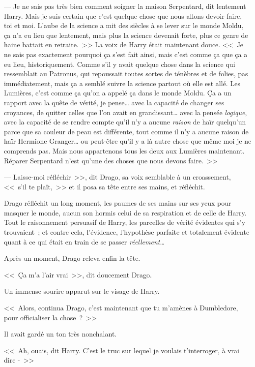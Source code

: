 --- Je ne sais pas très bien comment soigner la maison Serpentard, dit lentement Harry. Mais je suis certain que c'est quelque chose que nous allons devoir faire, toi et moi. L'aube de la science a mit des siècles à se lever sur le monde Moldu, ça n'a eu lieu que lentement, mais plus la science devenait forte, plus ce genre de haine battait en retraite.~>> La voix de Harry était maintenant douce. <<~Je ne sais pas exactement pourquoi ça s'est fait ainsi, mais c'est comme ça que ça a eu lieu, historiquement. Comme s'il y avait quelque chose dans la science qui ressemblait au Patronus, qui repoussait toutes sortes de ténèbres et de folies, pas immédiatement, mais ça a semblé suivre la science partout où elle est allé. Les Lumières, c'est comme ça qu'on a appelé ça dans le monde Moldu. Ça a un rapport avec la quête de vérité, je pense… avec la capacité de changer ses croyances, de quitter celles que l'on avait en grandissant… avec la pensée \emph{logique}, avec la capacité de se rendre compte qu'il n'y a aucune \emph{raison} de haïr quelqu'un parce que sa couleur de peau est différente, tout comme il n'y a aucune raison de haïr Hermione Granger… ou peut-être qu'il y a là autre chose que même moi je ne comprends pas. Mais nous appartenons tous les deux aux Lumières maintenant. Réparer Serpentard n'est qu'une des choses que nous devons faire.~>>

--- Laisse-moi réfléchir~>>, dit Drago, sa voix semblable à un croassement, <<~s'il te plaît,~>> et il posa sa tête entre ses mains, et réfléchit.

\later

Drago réfléchit un long moment, les paumes de ses mains sur ses yeux pour masquer le monde, aucun son hormis celui de sa respiration et de celle de Harry. Tout le raisonnement persuasif de Harry, les parcelles de vérité évidentes qui s'y trouvaient~; et contre cela, l'évidence, l'hypothèse parfaite et totalement évidente quant à ce qui était en train de se passer \emph{réellement}…

Après un moment, Drago releva enfin la tête.

<<~Ça m'a l'air vrai~>>, dit doucement Drago.

Un immense sourire apparut sur le visage de Harry.

<<~Alors, continua Drago, c'est maintenant que tu m'amènes à Dumbledore, pour officialiser la chose~?~>>

Il avait gardé un ton très nonchalant.

<<~Ah, ouais, dit Harry. C'est le truc sur lequel je voulais t'interroger, à vrai dire -~>>

